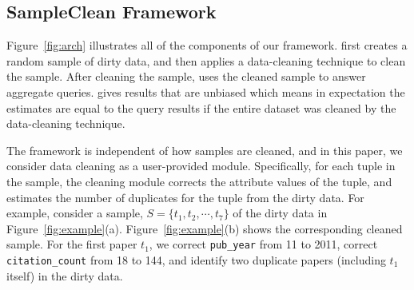 
\subsection{SampleClean Framework}\label{sec:paradigm}

Figure~\ref{fig:arch} illustrates all of the components of our framework.
\saqpplus first creates a random sample of dirty data, and then applies a data-cleaning technique to clean the sample. 
After cleaning the sample, \saqpplus uses the cleaned sample to answer aggregate queries.
\saqpplus gives results that are unbiased which means in expectation the estimates are equal to the query results if the entire dataset was cleaned by the data-cleaning technique.

The \saqpplus framework is independent of how samples are cleaned, and in this paper, we consider data cleaning as a user-provided module. %
Specifically, for each tuple in the sample, the cleaning module corrects the attribute values of the tuple, and estimates the number of duplicates for the tuple from the dirty data.
For example, consider a sample, $S = \{t_1, t_2, \cdots, t_7\}$ of the dirty data in Figure~\ref{fig:example}(a). Figure~\ref{fig:example}(b) shows the corresponding cleaned sample. For the first paper $t_1$, we correct \texttt{pub\_year} from 11 to 2011, correct \texttt{citation\_count} from 18 to 144, and identify two duplicate papers (including $t_1$ itself) in the dirty data.

